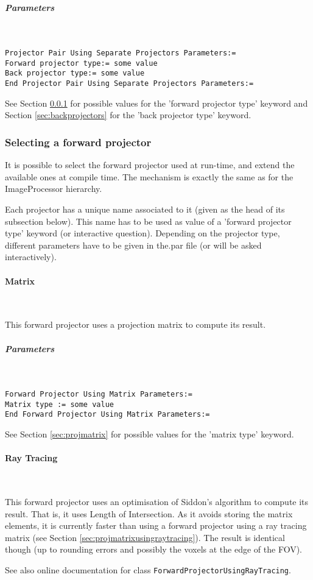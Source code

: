 \documentclass{article}
\newcommand{\subsubsubsection}[1]{\paragraph{#1}\mbox{} \\}
\newcommand{\subsubsubsubsection}[1]{\subparagraph{#1} \mbox{} \\}
\begin{document}
{{{ \subsubsubsubsection{Parameters}
}
\begin{verbatim}
Projector Pair Using Separate Projectors Parameters:=
Forward projector type:= some value
Back projector type:= some value
End Projector Pair Using Separate Projectors Parameters:=
\end{verbatim}

See Section \ref{sec:forwardprojectors} for possible values for the 'forward projector 
type' keyword and Section \ref{sec:backprojectors} for the 'back projector type' 
keyword.


\subsubsection{
Selecting a forward projector}
\label{sec:forwardprojectors}
It is possible to select the forward projector used at run-time, 
and extend the available ones at compile time. The mechanism 
is exactly the same as for the ImageProcessor hierarchy.


Each projector has a unique name associated to it (given as the 
head of its subsection below). This name has to be used as value 
of a 'forward projector type' keyword (or interactive question). 
Depending on the projector type, different parameters have to 
be given in the.par file (or will be asked interactively).

{ \subsubsubsection{Matrix}
}
This forward projector uses a projection matrix to compute its 
result.

{ \subsubsubsubsection{Parameters}
}
\begin{verbatim}
Forward Projector Using Matrix Parameters:=
Matrix type := some value
End Forward Projector Using Matrix Parameters:=
\end{verbatim}

See Section \ref{sec:projmatrix} for possible values for the 'matrix type' keyword.

{ \subsubsubsection{Ray Tracing}
}
This forward projector uses an optimisation of Siddon's algorithm 
to compute its result. That is, it uses Length of Intersection. 
As it avoids storing the matrix elements, it is currently faster 
than using a forward projector using a ray tracing matrix (see 
Section \ref{sec:projmatrixusingraytracing}). The result is identical though (up to rounding 
errors and possibly the voxels at the edge of the FOV).


See also online documentation for class \texttt{ForwardProjectorUsingRayTracing}.

}}
\end{document}
